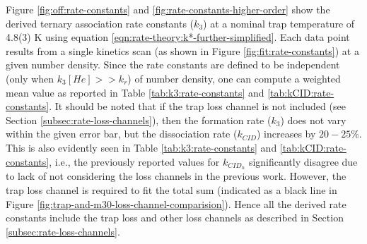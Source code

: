 Figure \ref{fig:off:rate-constants} and \ref{fig:rate-constants-higher-order}
show the derived ternary association rate constants ($k_3$) at a nominal trap
temperature of 4.8(3) K using equation
\ref{eqn:rate-theory:k*-further-simplified}. Each data point results from a
single kinetics scan (as shown in Figure \ref{fig:fit:rate-constants}) at a
given number density. Since the rate constants are defined to be independent
(only when $k_3[He] >> k_r$) of number density, one can compute a weighted mean
value as reported in Table \ref{tab:k3:rate-constants} and
\ref{tab:kCID:rate-constants}. It should be noted that if the trap loss channel
is not included (see Section \ref{subsec:rate-loss-channels}), then the
formation rate ($k_3$) does not vary within the given error bar, but the
dissociation rate ($k_{CID}$) increases by $20-25\%$. This is also evidently
seen in Table \ref{tab:k3:rate-constants} and
\ref{tab:kCID:rate-constants}, i.e., the previously reported values
\cite{Brunken2017} for $k_{CID_n}$ significantly disagree due to
lack of not considering the loss channels in the previous work. However, the trap loss channel is
required to fit the total sum (indicated as a black line in Figure
\ref{fig:trap-and-m30-loss-channel-comparision}). Hence all the derived rate
constants include the trap loss and other loss channels as described in Section
\ref{subsec:rate-loss-channels}.